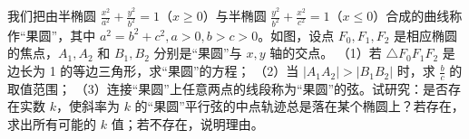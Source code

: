 \begin{question}
我们把由半椭圆 $\frac{x^2}{a^2}+\frac{y^2}{b^2}=1$（$x\ge0$）与半椭圆 $\frac{y^2}{b^2}+\frac{x^2}{c^2}=1$（$x\le0$）合成的曲线称作“果圆”，其中 $a^2=b^2+c^2,a>0,b>c>0$。如图，设点 $F_0,F_1,F_2$ 是相应椭圆的焦点，$A_1,A_2$ 和 $B_1,B_2$ 分别是“果圆”与 $x,y$ 轴的交点。
（1）若 $\triangle F_0F_1F_2$ 是边长为 1 的等边三角形，求“果圆”的方程；
（2）当 $|A_1A_2|>|B_1B_2|$ 时，求 $\frac bc$ 的取值范围；
（3）连接“果圆”上任意两点的线段称为“果圆”的弦。试研究：是否存在实数 $k$，使斜率为 $k$ 的“果圆”平行弦的中点轨迹总是落在某个椭圆上？若存在，求出所有可能的 $k$ 值；若不存在，说明理由。
\nopagebreak[4]
\begin{center}\end{center}
\nopagebreak[4]

\end{question}
